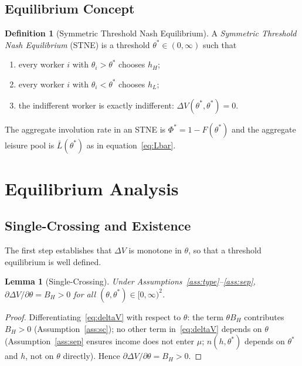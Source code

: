 \documentclass[12pt]{article}
\theoremstyle{plain}
\newtheorem{lemma}{Lemma}
\theoremstyle{definition}
\newtheorem{definition}{Definition}
\theoremstyle{remark}
\newcommand{\tstar}{\theta^{*}}
\newcommand{\Lbar}{\bar{L}}
\newcommand{\hH}{h_{H}}
\newcommand{\hL}{h_{L}}
\newcommand{\DeltaV}{\Delta V}
\newcommand{\Phistar}{\Phi^{*}}
\begin{document}
\subsection{Equilibrium Concept}

\begin{definition}[Symmetric Threshold Nash Equilibrium]
A \emph{Symmetric Threshold Nash Equilibrium} (STNE) is a threshold
$\tstar \in (0,\infty)$ such that
\begin{enumerate}
  \item every worker $i$ with $\theta_{i} > \tstar$ chooses $\hH$;
  \item every worker $i$ with $\theta_{i} < \tstar$ chooses $\hL$;
  \item the indifferent worker is exactly indifferent:
        $\DeltaV(\tstar, \tstar) = 0$.
\end{enumerate}
\end{definition}

The aggregate involution rate in an STNE is $\Phistar = 1 - F(\tstar)$ and the
aggregate leisure pool is $\Lbar(\tstar)$ as in equation~\eqref{eq:Lbar}.

\section{Equilibrium Analysis}
\label{sec:eq}

\subsection{Single-Crossing and Existence}

The first step establishes that $\DeltaV$ is monotone in $\theta$, so that a
threshold equilibrium is well defined.

\begin{lemma}[Single-Crossing]
\label{lem:sc}
Under Assumptions~\ref{ass:type}--\ref{ass:sep},
$\partial\DeltaV / \partial\theta = B_{H} > 0$ for all
$(\theta, \tstar) \in [0,\infty)^{2}$.
\end{lemma}

\begin{proof}
Differentiating~\eqref{eq:deltaV} with respect to $\theta$: the term $\theta B_{H}$
contributes $B_{H} > 0$ (Assumption~\ref{ass:sc}); no other term
in~\eqref{eq:deltaV} depends on $\theta$ (Assumption~\ref{ass:sep} ensures income
does not enter $\mu$; $n(h, \tstar)$ depends on $\tstar$ and $h$, not on $\theta$
directly).  Hence $\partial\DeltaV/\partial\theta = B_{H} > 0$.
\end{proof}
\end{document}
